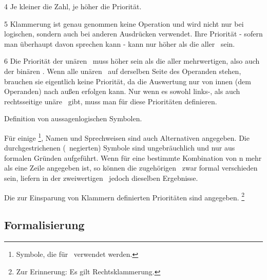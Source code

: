 \begin{table}
\begin{threeparttable}
\begin{tablenotes}
			\item[4] Je kleiner die Zahl, je höher die Priorität.
			\item[5] Klammerung ist genau genommen keine Operation und wird nicht nur bei logischen, sondern auch bei anderen Ausdrücken verwendet. Ihre Priorität - sofern man überhaupt davon sprechen kann - kann nur höher als die aller \Junktoren\ sein.
			\item[6] Die Priorität der unären \Operatoren\ muss höher sein als die aller mehrwertigen, also auch der binären \Operatoren.
			Wenn alle unären \Operatoren\ auf derselben Seite des Operanden stehen, brauchen sie eigentlich keine Priorität, da die Auswertung nur von innen (dem Operanden) nach außen erfolgen kann.
			Nur wenn es sowohl links-, als auch rechtsseitige unäre \Operatoren\ gibt, muss man für diese Prioritäten definieren.
		\end{tablenotes}
	\end{threeparttable}
	\caption{Definition von aussagenlogischen Symbolen.}
	\label{tab:Symbole}%
\end{table}

Für einige \Junktorsymbole%
\footnote{%
	Symbole, die für \Junktoren\ verwendet werden.
},
Namen und Sprechweisen sind auch Alternativen angegeben.
Die durchgestrichenen (\textdh\ negierten) Symbole sind ungebräuchlich und nur aus formalen Gründen aufgeführt.
Wenn für eine bestimmte Kombination von n mehr als eine Zeile angegeben ist, so können die zugehörigen \Junktoren\ zwar formal verschieden sein, liefern in der zweiwertigen \Aussagenlogik\ jedoch dieselben Ergebnisse.

Die zur Einsparung von Klammern definierten Prioritäten sind  angegeben.%
\footnote{Zur Erinnerung: Es gilt Rechtsklammerung. }

\subsection{Formalisierung}%
\label{sub:Formalisierung}


